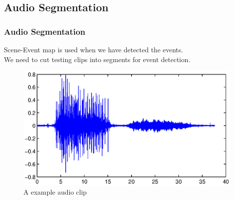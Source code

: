 \documentclass[xcolor=table,slidestop,compress,mathserif]{beamer}
\begin{document}
\subsection{Audio Segmentation}
\begin{frame}
	\frametitle{Audio Segmentation}	
	Scene-Event map is used when we have detected the events. \\ 
	We need to cut testing clips into segments for event detection. \\ 
	\begin{figure}
	\includegraphics[scale=0.5]{figure/tune_part.eps}
	\caption{A example audio clip}
	\end{figure}
\end{frame}
\end{document}

